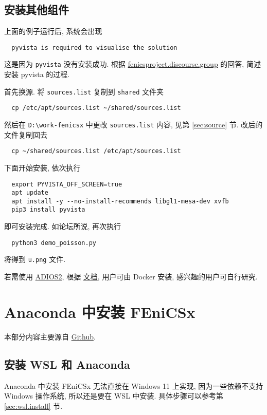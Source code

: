 \documentclass[fontset=founder]{ctexrep}
\begin{document}
\section{安装其他组件}

上面的例子运行后,
系统会出现
\begin{lstlisting}
  pyvista is required to visualise the solution
\end{lstlisting}
这是因为 \texttt{pyvista} 没有安装成功.
根据 \href{https://fenicsproject.discourse.group/t/how-to-use-pyvista-in-docker-for-windows-10-user/6921}{fenicsproject.discourse.group} 的回答,
简述安装 pyvista 的过程.

首先换源.
将 \texttt{sources.list} 复制到 \texttt{shared} 文件夹
\begin{lstlisting}
  cp /etc/apt/sources.list ~/shared/sources.list
\end{lstlisting}
然后在 \texttt{D:\textbackslash work-fenicsx} 中更改 \texttt{sources.list} 内容,
见第 \ref{sec:source} 节.
改后的文件复制回去
\begin{lstlisting}
  cp ~/shared/sources.list /etc/apt/sources.list
\end{lstlisting}

下面开始安装,
依次执行
\begin{lstlisting}
  export PYVISTA_OFF_SCREEN=true
  apt update
  apt install -y --no-install-recommends libgl1-mesa-dev xvfb
  pip3 install pyvista
\end{lstlisting}
即可安装完成.
如论坛所说,
再次执行
\begin{lstlisting}
  python3 demo_poisson.py
\end{lstlisting}
将得到 \texttt{u.png} 文件.

若需使用
\href{https://github.com/ornladios/ADIOS2}{ADIOS2},
根据%
\href{https://adios2.readthedocs.io/en/latest/setting_up/setting_up.html#docker}{文档},
用户可由 Docker 安装,
感兴趣的用户可自行研究.

\chapter{Anaconda 中安装 FEniCSx}

本部分内容主要源自
\href{https://github.com/FEniCS/dolfinx#conda}{Github}.

\section{安装 WSL 和 Anaconda}

Anaconda 中安装 FEniCSx 无法直接在 Windows 11 上实现,
因为一些依赖不支持 Windows 操作系统,
所以还是要在 WSL 中安装.
具体步骤可以参考第 \ref{sec:wsl.install} 节.
\end{document}
